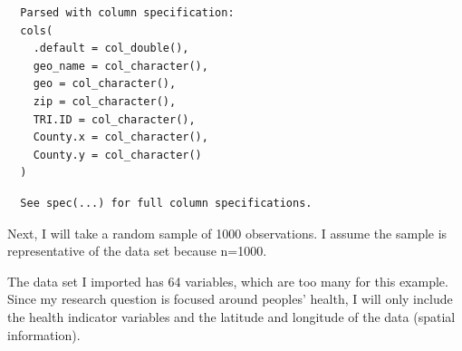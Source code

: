 \documentclass[12pt,twoside]{amherstthesis}
\begin{document}
  \begin{Shaded}
  \begin{Highlighting}[]
  \StringTok{ }\NormalTok{(}\NormalTok{)}
  \end{Highlighting}
  \end{Shaded}
  
  \begin{verbatim}
  Parsed with column specification:
  cols(
    .default = col_double(),
    geo_name = col_character(),
    geo = col_character(),
    zip = col_character(),
    TRI.ID = col_character(),
    County.x = col_character(),
    County.y = col_character()
  )
  \end{verbatim}
  
  \begin{verbatim}
  See spec(...) for full column specifications.
  \end{verbatim}
  
  Next, I will take a random sample of 1000 observations. I assume the
  sample is representative of the data set because n=1000.
  
  \begin{Shaded}
  \begin{Highlighting}[]
  \NormalTok{(}\NormalTok{)}
  \StringTok{ }\NormalTok{data_subset[}\NormalTok{(}\OperatorTok{:}\NormalTok{,}
     \NormalTok{),]}
  \end{Highlighting}
  \end{Shaded}
  
  The data set I imported has 64 variables, which are too many for this
  example. Since my research question is focused around peoples' health, I
  will only include the health indicator variables and the latitude and
  longitude of the data (spatial information).
  
  \begin{Shaded}
  \begin{Highlighting}[]
  \StringTok{ }\NormalTok{(}\NormalTok{, }\NormalTok{, }\NormalTok{, }\NormalTok{, }\NormalTok{, }\NormalTok{)}
  \StringTok{ }
  \end{Highlighting}
  \end{Shaded}
  
\end{document}
